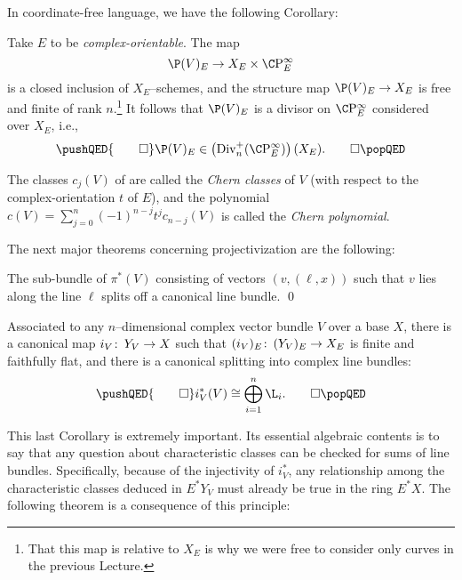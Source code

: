 In coordinate-free language, we have the following Corollary:
\begin{corollary}
Take \(E\) to be \emph{complex-orientable}.  The map \[\P(V)_E \to X_E \times \CP^\infty_E\] is a closed inclusion of \(X_E\)--schemes, and the structure map \(\P(V)_E \to X_E\) is free and finite of rank \(n\).\footnote{That this map is relative to $X_E$ is why we were free to consider only curves in the previous Lecture.}  It follows that \(\P(V)_E\) is a divisor on \(\CP^\infty_E\) considered over \(X_E\), i.e.,
\[\pushQED{\qed}
\P(V)_E \in \left(\Div_n^+(\CP^\infty_E)\right)(X_E). \qedhere
\popQED\]
\end{corollary}

\begin{definition}
The classes \(c_j(V)\) of  are called the \textit{Chern classes} of \(V\) (with respect to the complex-orientation \(t\) of \(E\)), and the polynomial \(c(V) = \sum_{j=0}^n (-1)^{n-j} t^j c_{n-j}(V)\) is called the \textit{Chern polynomial}.
\end{definition}

The next major theorems concerning projectivization are the following:

\begin{corollary}
The sub-bundle of \(\pi^*(V)\) consisting of vectors \((v, (\ell, x))\) such that \(v\) lies along the line \(\ell\) splits off a canonical line bundle. \qed
\end{corollary}

\begin{corollary}\label{OriginalSplittingPrinciple}
Associated to any \(n\)--dimensional complex vector bundle \(V\) over a base \(X\), there is a canonical map \(i_V\colon\thinspace Y_V \to X\) such that \((i_V)_E\colon\thinspace (Y_V)_E \to X_E\) is finite and faithfully flat, and there is a canonical splitting into complex line bundles:
\[\pushQED{\qed}
i_V^*(V) \cong \bigoplus_{i=1}^n \L_i. \qedhere
\popQED\]
\end{corollary}

This last Corollary is extremely important.  Its essential algebraic contents is to say that any question about characteristic classes can be checked for sums of line bundles.  Specifically, because of the injectivity of \(i_V^*\), any relationship among the characteristic classes deduced in \(E^* Y_V\) must already be true in the ring \(E^* X\).  The following theorem is a consequence of this principle:

